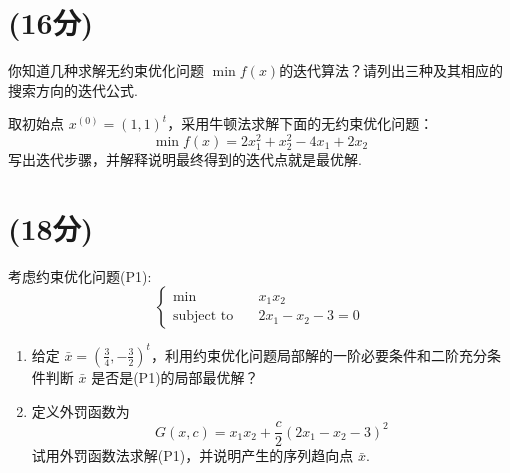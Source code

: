 

\usepackage{array,tabularx}

\usepackage{zhnumber} %
\renewcommand\thesection{\zhnum{section}}
\renewcommand\thesubsection{\arabic{section}}


\newcommand\Title{2020最优化方法final}

\newcommand\subject{\operatorname{subject\ to}}



\section{(16分)}
\begin{problem}
    你知道几种求解无约束优化问题 $\min f(x)$的迭代算法？请列出三种及其相应的搜索方向的迭代公式.
\end{problem}

\begin{problem}
    取初始点 $x^{(0)} = (1, 1)^t$，采用牛顿法求解下面的无约束优化问题：
    \[\min f(x) = 2x_1^2 + x_2^2 - 4x_1 + 2x_2\]
    写出迭代步骡，并解释说明最终得到的迭代点就是最优解.
\end{problem}

\section{(18分)}
\begin{problem}
    考虑约束优化问题(P1):\[\begin{cases}
        \min \quad &x_1x_2\\
        \subject \quad &2x_1 - x_2 - 3 = 0
    \end{cases}\]
    \begin{enumerate}
        \item 给定 $\bar{x} = (\frac{3}{4}, -\frac{3}{2})^t$，利用约束优化问题局部解的一阶必要条件和二阶充分条件判断 $\bar{x}$ 是否是(P1)的局部最优解？
        \item 定义外罚函数为 \[G(x, c) = x_1x_2 + \frac{c}{2}(2x_1 - x_2 - 3)^2\]试用外罚函数法求解(P1)，并说明产生的序列趋向点 $\bar{x}$.
    \end{enumerate}
\end{problem}


